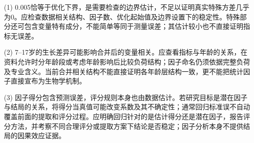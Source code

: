 (1) 0.005恰等于优化下界，是需要检查的边界估计，不足以证明真实特殊方差几乎为0。应检查数据相关结构、因子数、优化起始值及边界设置下的稳定性。特殊部分还可包含变量特有成分，不能简单等同于测量误差；其估计较小也不直接证明指标无误差。\par (2) 7--17岁的生长差异可能影响合并后的变量相关。应查看指标与年龄的关系，在资料允许时分年龄段或考虑年龄影响后比较负荷结构；因子命名仍须依据完整负荷及专业含义。当前合并相关结构不能直接证明各年龄层结构一致，更不能把统计因子直接宣布为生物学机制。\par (3) 因子得分包含预测误差，评分规则本身也由数据估计。若研究目标是潜在因子与结局的关系，将得分当真值可能改变系数及其不确定性；通常回归标准误不自动覆盖前面的提取和评分过程。应明确回归针对的是估计得分还是潜在因子，报告评分方法，并考察不同合理评分或提取方案下结论是否稳定；因子分析本身不提供结局的因果效应证据。
\par\nobreak\smallskip{}
